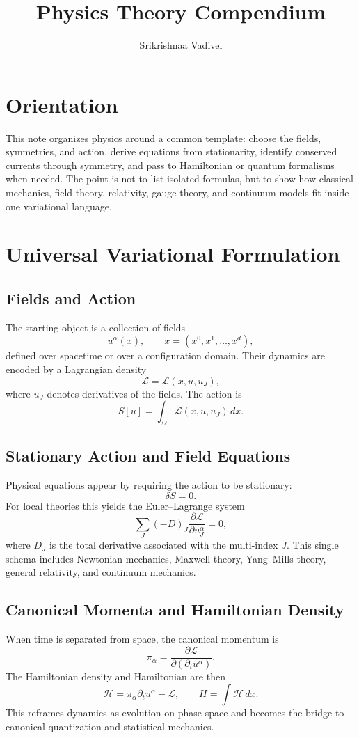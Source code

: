 \documentclass[11pt]{article}
\title{Physics Theory Compendium}
\author{Srikrishnaa Vadivel}
\date{}
\newcommand{\Lag}{\mathcal{L}}
\newcommand{\Ham}{\mathcal{H}}
\begin{document}
\maketitle
\tableofcontents

\section{Orientation}
This note organizes physics around a common template: choose the fields,
symmetries, and action, derive equations from stationarity, identify conserved
currents through symmetry, and pass to Hamiltonian or quantum formalisms when
needed. The point is not to list isolated formulas, but to show how classical
mechanics, field theory, relativity, gauge theory, and continuum models fit
inside one variational language.

\section{Universal Variational Formulation}
\subsection{Fields and Action}
The starting object is a collection of fields
\[
u^\alpha(x),
\qquad
x=(x^0,x^1,\dots,x^d),
\]
defined over spacetime or over a configuration domain. Their dynamics are
encoded by a Lagrangian density
\[
\Lag=\Lag(x,u,u_J),
\]
where $u_J$ denotes derivatives of the fields. The action is
\[
S[u]=\int_\Omega \Lag(x,u,u_J)\,dx.
\]

\subsection{Stationary Action and Field Equations}
Physical equations appear by requiring the action to be stationary:
\[
\boxed{\delta S=0.}
\]
For local theories this yields the Euler--Lagrange system
\[
\boxed{
\sum_J (-D)_J \frac{\partial \Lag}{\partial u^\alpha_J}=0,
}
\]
where $D_J$ is the total derivative associated with the multi-index $J$. This
single schema includes Newtonian mechanics, Maxwell theory, Yang--Mills theory,
general relativity, and continuum mechanics.

\subsection{Canonical Momenta and Hamiltonian Density}
When time is separated from space, the canonical momentum is
\[
\pi_\alpha=\frac{\partial \Lag}{\partial(\partial_t u^\alpha)}.
\]
The Hamiltonian density and Hamiltonian are then
\[
\Ham=\pi_\alpha \partial_t u^\alpha-\Lag,
\qquad
H=\int \Ham\,dx.
\]
This reframes dynamics as evolution on phase space and becomes the bridge to
canonical quantization and statistical mechanics.
\end{document}
